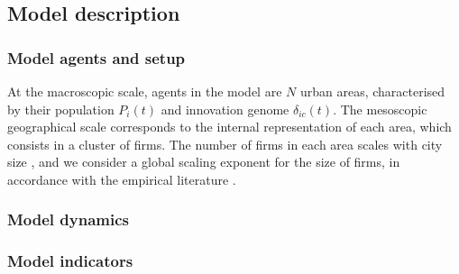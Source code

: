 \documentclass[letterpaper]{article}
\begin{document}

\cite{raimbault2022innovation}

\cite{raimbault2020model}


\subsection{Model description}


\subsubsection{Model agents and setup}

At the macroscopic scale, agents in the model are $N$ urban areas, characterised by their population $P_i(t)$ and innovation genome $\delta_{ic}(t)$. The mesoscopic geographical scale corresponds to the internal representation of each area, which consists in a cluster of firms. The number of firms in each area scales with city size \citep{pumain2006evolutionary},%
 and we consider a global scaling exponent for the size of firms, in accordance with the empirical literature \cite{axtell2001zipf}.

\subsubsection{Model dynamics}





\subsubsection{Model indicators}

\end{document}
